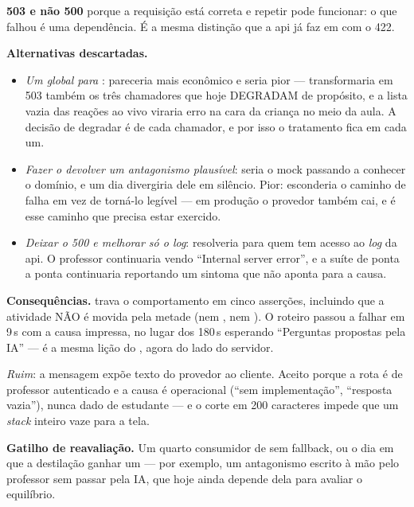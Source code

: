 \textbf{503 e não 500} porque a requisição está correta e repetir pode funcionar:
o que falhou é uma dependência. É a mesma distinção que a api já faz em
 com o 422.

\textbf{Alternativas descartadas.}
\begin{itemize}
  \item \emph{Um  global para }: pareceria
    mais econômico e seria pior --- transformaria em 503 também os três
    chamadores que hoje DEGRADAM de propósito, e a lista vazia das reações ao
    vivo viraria erro na cara da criança no meio da aula. A decisão de degradar é
    de cada chamador, e por isso o tratamento fica em cada um.
  \item \emph{Fazer o  devolver um antagonismo plausível}: seria
    o mock passando a conhecer o domínio, e um dia divergiria dele em silêncio.
    Pior: esconderia o caminho de falha em vez de torná-lo legível --- em
    produção o provedor também cai, e é esse caminho que precisa estar exercido.
  \item \emph{Deixar o 500 e melhorar só o \emph{log}}: resolveria para quem tem
    acesso ao \emph{log} da api. O professor continuaria vendo
    \enquote{Internal server error}, e a suíte de ponta a ponta continuaria
    reportando um sintoma que não aponta para a causa.
\end{itemize}

\textbf{Consequências.}  trava o
comportamento em cinco asserções, incluindo que a atividade NÃO é movida pela
metade (nem , nem ). O roteiro
 passou a falhar em 9\,s com a
causa impressa, no lugar dos 180\,s esperando \enquote{Perguntas propostas pela
IA} --- é a mesma lição do , agora do lado do servidor.

\emph{Ruim}: a mensagem expõe texto do provedor ao cliente. Aceito porque a rota
é de professor autenticado e a causa é operacional (\enquote{sem
implementação}, \enquote{resposta vazia}), nunca dado de estudante --- e o corte
em 200 caracteres impede que um \emph{stack} inteiro vaze para a tela.

\textbf{Gatilho de reavaliação.} Um quarto consumidor de  sem
fallback, ou o dia em que a destilação ganhar um --- por exemplo, um antagonismo
escrito à mão pelo professor sem passar pela IA, que hoje ainda depende dela para
avaliar o equilíbrio.

